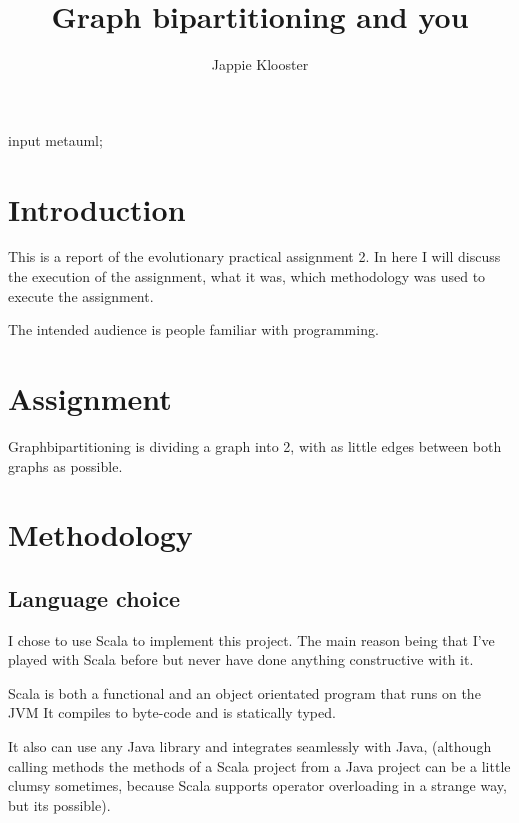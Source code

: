 \documentclass{article}
\begin{document}
\begin{empfile}
\begin{empcmds}
input metauml;
\end{empcmds}
\author{Jappie Klooster}
\title{Graph bipartitioning and you}
\maketitle

\section{Introduction}
This is a report of the evolutionary practical assignment 2.
In here I will discuss the execution of the assignment, what it was, which
methodology was used to execute the assignment.

The intended audience is people familiar with programming.

\section{Assignment}
Graphbipartitioning is dividing a graph into 2, with as little edges between
both graphs as possible.

\section{Methodology}

\subsection{Language choice}
I chose to use Scala to implement this project. The main reason being that I've
played with Scala before but never have done anything constructive with it.

Scala is both a functional and an object orientated program that runs on the JVM
It compiles to byte-code and is statically typed.

It also can use any Java library and integrates seamlessly with Java, (although
calling methods the methods of a Scala project from a Java project can be
a little clumsy sometimes, because Scala supports operator overloading in
a strange way, but its possible).


\end{empfile}
\end{document}
